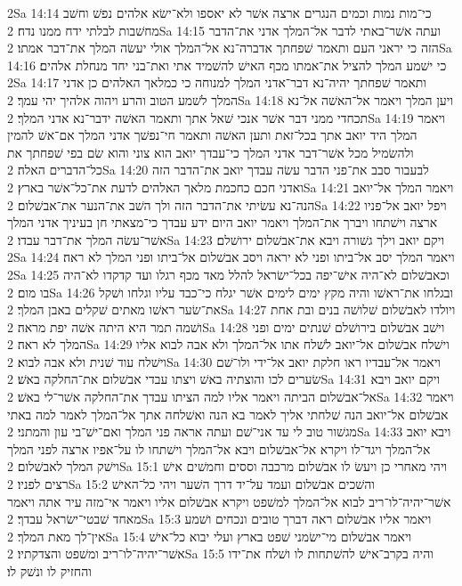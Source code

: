 2Sa 14:14  כי־מות נמות וכמים הנגרים ארצה אשׁר לא יאספו ולא־ישׂא אלהים נפשׁ וחשׁב מחשׁבות לבלתי ידח ממנו נדח׃
2Sa 14:15  ועתה אשׁר־באתי לדבר אל־המלך אדני את־הדבר הזה כי יראני העם ותאמר שׁפחתך אדברה־נא אל־המלך אולי יעשׂה המלך את־דבר אמתו׃
2Sa 14:16  כי ישׁמע המלך להציל את־אמתו מכף האישׁ להשׁמיד אתי ואת־בני יחד מנחלת אלהים׃
2Sa 14:17  ותאמר שׁפחתך יהיה־נא דבר־אדני המלך למנוחה כי כמלאך האלהים כן אדני המלך לשׁמע הטוב והרע ויהוה אלהיך יהי עמך׃
2Sa 14:18  ויען המלך ויאמר אל־האשׁה אל־נא תכחדי ממני דבר אשׁר אנכי שׁאל אתך ותאמר האשׁה ידבר־נא אדני המלך׃
2Sa 14:19  ויאמר המלך היד יואב אתך בכל־זאת ותען האשׁה ותאמר חי־נפשׁך אדני המלך אם־אשׁ להמין ולהשׂמיל מכל אשׁר־דבר אדני המלך כי־עבדך יואב הוא צוני והוא שׂם בפי שׁפחתך את כל־הדברים האלה׃
2Sa 14:20  לבעבור סבב את־פני הדבר עשׂה עבדך יואב את־הדבר הזה ואדני חכם כחכמת מלאך האלהים לדעת את־כל־אשׁר בארץ׃
2Sa 14:21  ויאמר המלך אל־יואב הנה־נא עשׂיתי את־הדבר הזה ולך השׁב את־הנער את־אבשׁלום׃
2Sa 14:22  ויפל יואב אל־פניו ארצה וישׁתחו ויברך את־המלך ויאמר יואב היום ידע עבדך כי־מצאתי חן בעיניך אדני המלך אשׁר־עשׂה המלך את־דבר עבדו׃
2Sa 14:23  ויקם יואב וילך גשׁורה ויבא את־אבשׁלום ירושׁלם׃
2Sa 14:24  ויאמר המלך יסב אל־ביתו ופני לא יראה ויסב אבשׁלום אל־ביתו ופני המלך לא ראה׃
2Sa 14:25  וכאבשׁלום לא־היה אישׁ־יפה בכל־ישׂראל להלל מאד מכף רגלו ועד קדקדו לא־היה בו מום׃
2Sa 14:26  ובגלחו את־ראשׁו והיה מקץ ימים לימים אשׁר יגלח כי־כבד עליו וגלחו ושׁקל את־שׂער ראשׁו מאתים שׁקלים באבן המלך׃
2Sa 14:27  ויולדו לאבשׁלום שׁלושׁה בנים ובת אחת ושׁמה תמר היא היתה אשׁה יפת מראה׃
2Sa 14:28  וישׁב אבשׁלום בירושׁלם שׁנתים ימים ופני המלך לא ראה׃
2Sa 14:29  וישׁלח אבשׁלום אל־יואב לשׁלח אתו אל־המלך ולא אבה לבוא אליו וישׁלח עוד שׁנית ולא אבה לבוא׃
2Sa 14:30  ויאמר אל־עבדיו ראו חלקת יואב אל־ידי ולו־שׁם שׂערים לכו והוצתיה באשׁ ויצתו עבדי אבשׁלום את־החלקה באשׁ׃
2Sa 14:31  ויקם יואב ויבא אל־אבשׁלום הביתה ויאמר אליו למה הציתו עבדך את־החלקה אשׁר־לי באשׁ׃
2Sa 14:32  ויאמר אבשׁלום אל־יואב הנה שׁלחתי אליך לאמר בא הנה ואשׁלחה אתך אל־המלך לאמר למה באתי מגשׁור טוב לי עד אני־שׁם ועתה אראה פני המלך ואם־ישׁ־בי עון והמתני׃
2Sa 14:33  ויבא יואב אל־המלך ויגד־לו ויקרא אל־אבשׁלום ויבא אל־המלך וישׁתחו לו על־אפיו ארצה לפני המלך וישׁק המלך לאבשׁלום׃
2Sa 15:1  ויהי מאחרי כן ויעשׂ לו אבשׁלום מרכבה וססים וחמשׁים אישׁ רצים לפניו׃
2Sa 15:2  והשׁכים אבשׁלום ועמד על־יד דרך השׁער ויהי כל־האישׁ אשׁר־יהיה־לו־ריב לבוא אל־המלך למשׁפט ויקרא אבשׁלום אליו ויאמר אי־מזה עיר אתה ויאמר מאחד שׁבטי־ישׂראל עבדך׃
2Sa 15:3  ויאמר אליו אבשׁלום ראה דברך טובים ונכחים ושׁמע אין־לך מאת המלך׃
2Sa 15:4  ויאמר אבשׁלום מי־ישׂמני שׁפט בארץ ועלי יבוא כל־אישׁ אשׁר־יהיה־לו־ריב ומשׁפט והצדקתיו׃
2Sa 15:5  והיה בקרב־אישׁ להשׁתחות לו ושׁלח את־ידו והחזיק לו ונשׁק לו׃
